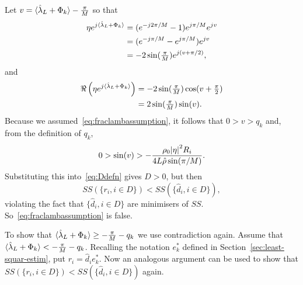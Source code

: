 \documentclass[journal]{IEEEtran}
\begin{document}
\begin{IEEEproof}
Let $v = \langle \hat{\lambda}_L + \Phi_k \rangle - \tfrac{\pi}{M}$ so that
\begin{align*}
\eta e^{j\langle \hat{\lambda}_L + \Phi_k \rangle} &= (e^{-j2\pi/M} - 1) e^{j \pi/M} e^{jv} \\
&= (e^{-j\pi/M} - e^{j\pi/M}) e^{jv} \\
&= -2 \sin(\tfrac{\pi}{M}) e^{j ( v + \pi/2) },
\end{align*}
and
\begin{align*}
\Re\left( \eta e^{j\langle \hat{\lambda}_L + \Phi_k \rangle}\right) &= -2 \sin(\tfrac{\pi}{M}) \cos(v + \tfrac{\pi}{2}) \\
 &= 2 \sin(\tfrac{\pi}{M}) \sin(v).
\end{align*}
Because we assumed~\eqref{eq:fraclambassumption}, it follows that $0 > v > q_k$ and, from the definition of $q_k$,
\[
0 > \sin(v) > -\frac{\rho_0 {\vert \eta \vert}^2 R_i}{4 L \hat{\rho} \sin(\pi/M)}.
\]
Substituting this into~\eqref{eq:Ddefn} gives $D > 0$, but then 
\[
SS(\{r_i, i \in D\}) < SS(\{\hat{d}_i, i \in D\}),
\] 
violating the fact that $\{\hat{d}_i, i \in D\}$ are minimisers of $SS$.  So~\eqref{eq:fraclambassumption} is false.

To show that $\langle \hat{\lambda}_L + \Phi_k \rangle \geq -\frac{\pi}{M} - q_k$ we use contradiction again.  Assume that $\langle \hat{\lambda}_L + \Phi_k \rangle < -\frac{\pi}{M} - q_k$.  Recalling the notation $e_k^*$ defined in Section~\ref{sec:least-squar-estim}, put $r_i = \hat{d}_i e_k^*$.  Now an analogous argument can be used to show that $SS(\{r_i, i \in D\}) < SS(\{\hat{d}_i, i \in D\})$ again.
\end{IEEEproof}
\end{document}
